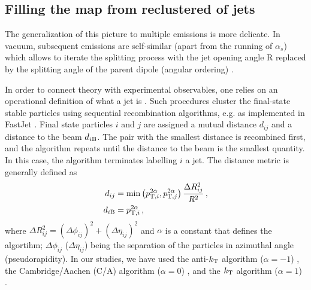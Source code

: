 

\subsection{Filling the map from reclustered of jets}
\label{sec:iterative-declustering}

The generalization of this picture to multiple emissions is more delicate. In vacuum, subsequent emissions are self-similar (apart from the running of $\alpha_s$) which allows to iterate the splitting process with the jet opening angle R replaced by the splitting angle of the parent dipole (angular ordering) \cite{Ellis:1991qj,Dokshitzer:1991wu}. 

In order to connect theory with experimental observables, one relies on an operational definition of what a jet is \cite{Salam:2009jx}. Such procedures cluster the final-state stable particles using sequential recombination algorithms, e.g. as implemented in FastJet \cite{Cacciari:2005hq,Cacciari:2011ma}. Final state particles $i$ and $j$ are assigned a mutual distance $d_{ij}$ and a distance to the beam $d_{i\rm B}$. The pair with the smallest distance is recombined first, and the algorithm repeats until the distance to the beam is the smallest quantity. In this case, the algorithm terminates labelling $i$ a jet. The distance metric is generally defined as
\begin{align}
\label{eq:JetDistanceMetric}
d_{ij} &= \min\left(p_{{\rm \tiny T},i}^{2\alpha},p_{{\rm \tiny T},j}^{2\alpha} \right) \frac{\Delta R_{ij}^2}{R^2} \,, \\
d_{i \rm B} &= p_{{\rm \tiny T},i}^{2\alpha} \,,
\end{align}
where $\Delta R_{ij}^2 = (\Delta \phi_{ij})^2 + (\Delta \eta_{ij})^2$ and $\alpha$ is a constant that defines the algortihm; $\Delta \phi_{ij}$ ($\Delta \eta_{ij}$) being the separation of the particles in azimuthal angle (pseudorapidity). In our studies, we have used the anti-$k_{\rm \tiny T}$ algorithm ($\alpha = -1$) \cite{Cacciari:2008gp}, the Cambridge/Aachen (C/A) algorithm ($\alpha = 0$) \cite{Dokshitzer:1997in,Wobisch:1998wt}, and the $k_{\rm \tiny T}$ algorithm ($\alpha = 1$) \cite{Catani:1993hr,Ellis:1993tq}.

